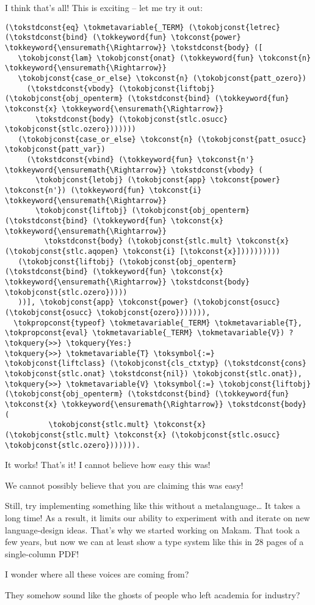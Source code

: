 \heroSTUDENT{} I think that's all! This is exciting -- let me try it out:

\begin{verbatim}
(\tokstdconst{eq} \tokmetavariable{_TERM} (\tokobjconst{letrec} (\tokstdconst{bind} (\tokkeyword{fun} \tokconst{power} \tokkeyword{\ensuremath{\Rightarrow}} \tokstdconst{body} ([
   \tokobjconst{lam} \tokobjconst{onat} (\tokkeyword{fun} \tokconst{n} \tokkeyword{\ensuremath{\Rightarrow}}
   \tokobjconst{case_or_else} \tokconst{n} (\tokobjconst{patt_ozero})
     (\tokstdconst{vbody} (\tokobjconst{liftobj} (\tokobjconst{obj_openterm} (\tokstdconst{bind} (\tokkeyword{fun} \tokconst{x} \tokkeyword{\ensuremath{\Rightarrow}}
       \tokstdconst{body} (\tokobjconst{stlc.osucc} \tokobjconst{stlc.ozero}))))))
   (\tokobjconst{case_or_else} \tokconst{n} (\tokobjconst{patt_osucc} \tokobjconst{patt_var})
     (\tokstdconst{vbind} (\tokkeyword{fun} \tokconst{n'} \tokkeyword{\ensuremath{\Rightarrow}} \tokstdconst{vbody} (
       \tokobjconst{letobj} (\tokobjconst{app} \tokconst{power} \tokconst{n'}) (\tokkeyword{fun} \tokconst{i} \tokkeyword{\ensuremath{\Rightarrow}}
       \tokobjconst{liftobj} (\tokobjconst{obj_openterm} (\tokstdconst{bind} (\tokkeyword{fun} \tokconst{x} \tokkeyword{\ensuremath{\Rightarrow}}
         \tokstdconst{body} (\tokobjconst{stlc.mult} \tokconst{x} (\tokobjconst{stlc.aqopen} \tokconst{i} [\tokconst{x}])))))))))
   (\tokobjconst{liftobj} (\tokobjconst{obj_openterm} (\tokstdconst{bind} (\tokkeyword{fun} \tokconst{x} \tokkeyword{\ensuremath{\Rightarrow}} \tokstdconst{body} \tokobjconst{stlc.ozero}))))
   ))], \tokobjconst{app} \tokconst{power} (\tokobjconst{osucc} (\tokobjconst{osucc} \tokobjconst{ozero})))))),
  \tokpropconst{typeof} \tokmetavariable{_TERM} \tokmetavariable{T}, \tokpropconst{eval} \tokmetavariable{_TERM} \tokmetavariable{V}) ?
\tokquery{>>} \tokquery{Yes:}
\tokquery{>>} \tokmetavariable{T} \toksymbol{:=} \tokobjconst{liftclass} (\tokobjconst{cls_ctxtyp} (\tokstdconst{cons} \tokobjconst{stlc.onat} \tokstdconst{nil}) \tokobjconst{stlc.onat}),
\tokquery{>>} \tokmetavariable{V} \toksymbol{:=} \tokobjconst{liftobj} (\tokobjconst{obj_openterm} (\tokstdconst{bind} (\tokkeyword{fun} \tokconst{x} \tokkeyword{\ensuremath{\Rightarrow}} \tokstdconst{body} (
          \tokobjconst{stlc.mult} \tokconst{x} (\tokobjconst{stlc.mult} \tokconst{x} (\tokobjconst{stlc.osucc} \tokobjconst{stlc.ozero})))))).
\end{verbatim}

\noindent
It works! That's it! I cannot believe how easy this was!

\heroAUDIENCE{} We cannot possibly believe that you are claiming this was
easy!

\heroAUTHOR{} Still, try implementing something like this without a
metalanguage\ldots{} It takes a long time! As a result, it limits our
ability to experiment with and iterate on new language-design ideas.
That's why we started working on Makam. That took a few years, but now
we can at least show a type system like this in 28 pages of a
single-column PDF!

\heroADVISOR{} I wonder where all these voices are coming from?

\heroSTUDENT{} They somehow sound like the ghosts of people who left academia
for industry?

